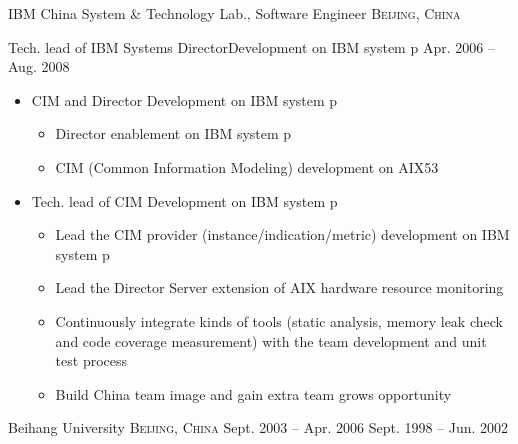 \documentclass[10pt,letterpaper]{article}
\begin{document}
\headedsection 
{IBM China System \& Technology Lab., Software Engineer}
{\textsc{Beijing, China}} {

\headedsubsection %
{Tech. lead of IBM Systems Director\texttrademark Development on IBM system p}
{Apr. 2006 -- Aug. 2008}
{
    \begin{itemize}
        \item CIM and Director Development on IBM system p
    \begin{itemize}
\item Director enablement on IBM system p
\item CIM (Common Information Modeling) development on AIX53
    \end{itemize}
\item Tech. lead of CIM Development on IBM system p
    \begin{itemize}
        \item Lead the CIM provider (instance/indication/metric) development on
    IBM system p
\item Lead the Director Server extension of AIX hardware resource
    monitoring
\item Continuously integrate kinds of tools (static analysis, memory leak
    check and code coverage measurement) with the team development and unit
    test process
\item Build China team image and gain extra team grows opportunity
    \end{itemize}
    \end{itemize}


}
}

\spacedhrule{-0.2em}{-0.4em} %



\headedsection
{Beihang University}
{\textsc{Beijing, China}} {
    {Sept. 2003 -- Apr. 2006} {}
 {Sept. 1998 -- Jun. 2002} {}
}

\spacedhrule{0.5em}{-0.4em} %
\end{document}
